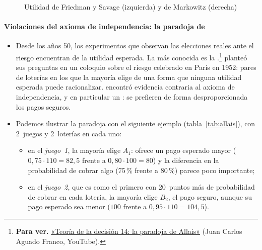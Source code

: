 \documentclass[11pt]{article}
\begin{document}
\begin{figure}[H]
\centering
\caption{Utilidad de Friedman y Savage (izquierda) y de Markowitz (derecha)}\label{fig:friedman-savage-markowitz}
\end{figure}

\paragraph{Violaciones del axioma de independencia: la paradoja de }

\begin{itemize}
\item Desde los años 50, los experimentos que observan las elecciones reales ante el riesgo encuentran  de la utilidad esperada. La más conocida es la .\footnote{\textbf{Para ver.} \href{https://youtu.be/FMEApkB4vUo}{«Teoría de la decisión 14: la paradoja de Allais»} (Juan Carlos Aguado Franco, YouTube).} \textcite{Allais1953Comportement} planteó sus preguntas en un coloquio sobre el riesgo celebrado en París en 1952: pares de loterías en los que la mayoría elige de una forma que ninguna utilidad esperada puede racionalizar.  encontró evidencia contraria al axioma de independencia, y en particular un : se prefieren de forma desproporcionada los pagos seguros.
\item Podemos ilustrar la paradoja con el siguiente ejemplo (tabla~\ref{tab:allais}), con 2~juegos y 2~loterías en cada uno:
  \begin{itemize}
  \item en el \emph{juego~1}, la mayoría elige $A_1$: ofrece un pago esperado mayor ($0{,}75\cdot 110=82{,}5$ frente a $0{,}80\cdot 100=80$) y la diferencia en la probabilidad de cobrar algo (75\,\% frente a 80\,\%) parece poco importante;
  \item en el \emph{juego~2}, que es como el primero con 20~puntos más de probabilidad de cobrar en cada lotería, la mayoría elige $B_2$, el pago seguro, aunque su pago esperado sea menor ($100$ frente a $0{,}95\cdot 110=104{,}5$).
  \end{itemize}
\end{itemize}
\end{document}
